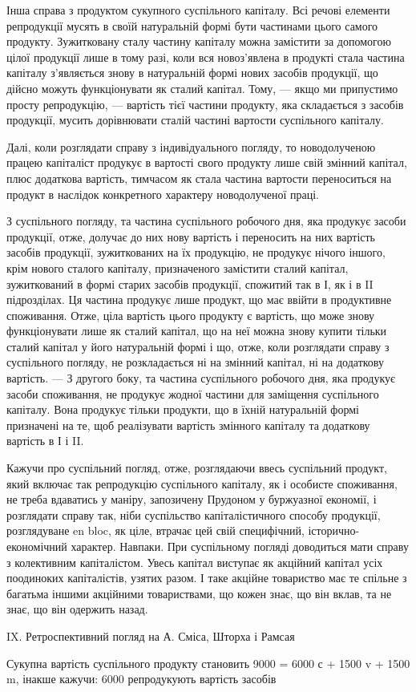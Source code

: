 Інша справа з продуктом сукупного суспільного капіталу. Всі речові
елементи репродукції мусять в своїй натуральній формі бути частинами
цього самого продукту. Зужитковану сталу частину капіталу можна замістити
за допомогою цілої продукції лише в тому разі, коли вся новоз’явлена
в продукті стала частина капіталу з’являється знову в натуральній
формі нових засобів продукції, що дійсно можуть функціонувати як сталий
капітал. Тому, — якщо ми припустимо просту репродукцію, — вартість
тієї частини продукту, яка складається з засобів продукції, мусить дорівнювати
сталій частині вартости суспільного капіталу.

Далі, коли розглядати справу з індивідуального погляду, то новодолученою
працею капіталіст продукує в вартості свого продукту лише свій змінний
капітал, плюс додаткова вартість, тимчасом як стала частина вартости
переноситься на продукт в наслідок конкретного характеру новодолученої
праці.

З суспільного погляду, та частина суспільного робочого дня, яка продукує
засоби продукції, отже, долучає до них нову вартість і переносить
на них вартість засобів продукції, зужиткованих на їх продукцію, не продукує
нічого іншого, крім нового сталого капіталу, призначеного
замістити сталий капітал, зужиткований в формі старих засобів продукції,
спожитий так в І, як і в II підрозділах. Ця частина продукує лише
продукт, що має ввійти в продуктивне споживання. Отже, ціла вартість
цього продукту є вартість, що може знову функціонувати лише як сталий
капітал, що на неї можна знову купити тільки сталий капітал у його
натуральній формі і що, отже, коли розглядати справу з суспільного погляду,
не розкладається ні на змінний капітал, ні на додаткову вартість.
— З другого боку, та частина суспільного робочого дня, яка продукує
засоби споживання, не продукує жодної частини для заміщення суспільного
капіталу. Вона продукує тільки продукти, що в їхній натуральній
формі призначені на те, щоб реалізувати вартість змінного капіталу
та додаткову вартість в І і II.

Кажучи про суспільний погляд, отже, розглядаючи ввесь суспільний
продукт, який включає так репродукцію суспільного капіталу, як і особисте
споживання, не треба вдаватись у маніру, запозичену Прудоном
у буржуазної економії, і розглядати справу так, ніби суспільство капіталістичного
способу продукції, розглядуване en bloc, як ціле, втрачає цей
свій специфічний, історично-економічний характер. Навпаки. При суспільному
погляді доводиться мати справу з колективним капіталістом. Увесь
капітал виступає як акційний капітал усіх поодиноких капіталістів, узятих
разом. І таке акційне товариство має те спільне з багатьма іншими
акційними товариствами, що кожен знає, що він вклав, та не знає, що
він одержить назад.

IX. Ретроспективний погляд на А. Сміса, Шторха і Рамсая

Сукупна вартість суспільного продукту становить 9000 = 6000 с +
1500 v + 1500 m, інакше кажучи: 6000 репродукують вартість засобів
\parbreak{}  %
